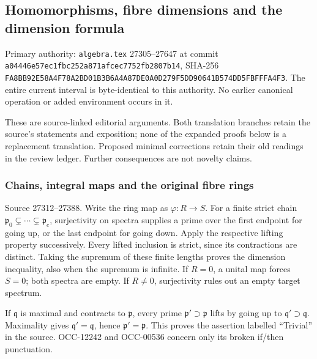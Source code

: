 \subsection{Homomorphisms, fibre dimensions and the dimension formula}\label{algebra-proof-024-homomorphisms-fibre-dimensions-and-the-dimension-formula}

Primary authority: \texttt{algebra.tex} 27305--27647 at commit \texttt{a044\allowbreak{}46e5\allowbreak{}7ec1\allowbreak{}fbc2\allowbreak{}52a8\allowbreak{}71af\allowbreak{}cec7\allowbreak{}752f\allowbreak{}b280\allowbreak{}7b14}, SHA-256 \texttt{FA8B\allowbreak{}B92E\allowbreak{}58A4\allowbreak{}F78A\allowbreak{}2BD0\allowbreak{}1B3B\allowbreak{}6A4A\allowbreak{}87DE\allowbreak{}0A0D\allowbreak{}279F\allowbreak{}5DD9\allowbreak{}0641\allowbreak{}B574\allowbreak{}DD5F\allowbreak{}BFFF\allowbreak{}A4F3}. The entire current interval is byte-identical to this authority. No earlier canonical operation or added environment occurs in it.

These are source-linked editorial arguments. Both translation branches retain the source's statements and exposition; none of the expanded proofs below is a replacement translation. Proposed minimal corrections retain their old readings in the review ledger. Further consequences are not novelty claims.

\subsubsection{Chains, integral maps and the original fibre rings}\label{algebra-proof-024-chains-integral-maps-and-the-original-fibre-rings}

Source 27312--27388. Write the ring map as \(\varphi:R\to S\). For a finite strict chain \(\mathfrak p_0\subsetneq\cdots\subsetneq
\mathfrak p_e\), surjectivity on spectra supplies a prime over the first endpoint for going up, or the last endpoint for going down. Apply the respective lifting property successively. Every lifted inclusion is strict, since its contractions are distinct. Taking the supremum of these finite lengths proves the dimension inequality, also when the supremum is infinite. If \(R=0\), a unital map forces \(S=0\); both spectra are empty. If \(R\ne0\), surjectivity rules out an empty target spectrum.

If \(\mathfrak q\) is maximal and contracts to \(\mathfrak p\), every prime \(\mathfrak p'\supset\mathfrak p\) lifts by going up to \(\mathfrak q'\supset\mathfrak q\). Maximality gives \(\mathfrak q'=\mathfrak q\), hence \(\mathfrak p'=\mathfrak p\). This proves the assertion labelled ``Trivial'' in the source. OCC-12242 and OCC-00536 concern only its broken if/then punctuation.

